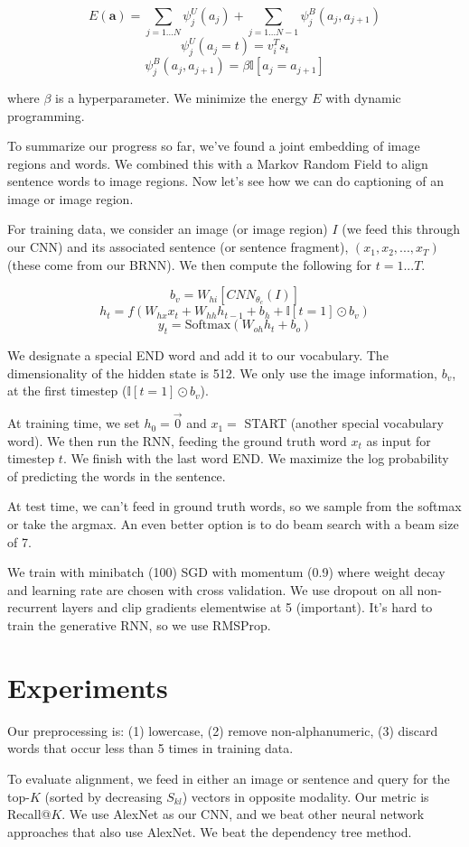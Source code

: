 \documentclass[a4paper]{article}
\begin{document}
$$
E(\mathbf{a}) = \sum_{j = 1...N}{\psi_{j}^U(a_j)}
 + \sum_{j=1...N-1}{\psi_j^B(a_j, a_{j+1})}
$$
$$
\psi_{j}^U(a_j = t) = v_i^T s_t
$$
$$
\psi_j^B(a_j, a_{j+1}) = \beta \mathbb{I}[a_j = a_{j+1}]
$$

where $\beta$ is a hyperparameter. We minimize the energy $E$ with dynamic
programming.

To summarize our progress so far, we've found a joint embedding of image regions
and words. We combined this with a Markov Random Field to align sentence words
to image regions. Now let's see how we can do captioning of an image or
image region.

For training data, we consider an image (or image region) $I$ (we feed this 
through our CNN) and its associated sentence (or sentence fragment),
$(x_1, x_2, ..., x_T)$ (these come from our BRNN). We then compute the following
for $t = 1...T$.

$$
b_v = W_{hi}[CNN_{\theta_c}(I)]
$$
$$
h_t = f(W_{hx} x_t + W_{hh} h_{t-1} + b_h + \mathbb{I}[t=1] \odot b_v)
$$
$$
y_t = \textrm{Softmax}(W_{oh} h_t + b_o)
$$

We designate a special END word and add it to our vocabulary. The 
dimensionality of the hidden state is 512. We only use the image information, 
$b_v$, at the first timestep ($\mathbb{I}[t=1] \odot b_v$).

At training time, we set $h_0 = \vec{0}$ and $x_1 = $ START (another special
vocabulary word). We then run the RNN, feeding the ground truth word $x_t$ as
input for timestep $t$. We finish with the last word END. We maximize the
log probability of predicting the words in the sentence.

At test time, we can't feed in ground truth words, so we sample from the
softmax or take the argmax. An even better option is to do beam search with
a beam size of 7.

We train with minibatch (100) SGD with momentum (0.9) where weight decay
and learning rate are chosen with cross validation. We use dropout on all
non-recurrent layers and clip gradients elementwise at 5 (important). It's hard
to train the generative RNN, so we use RMSProp.

\section{Experiments}
Our preprocessing is: (1) lowercase, (2) remove non-alphanumeric, (3) discard
words that occur less than 5 times in training data.

To evaluate alignment, we feed in either an image or sentence and query for
the top-$K$ (sorted by decreasing $S_{kl}$) vectors in opposite modality.
Our metric is Recall@$K$. We use AlexNet as our CNN, and we beat other neural
network approaches that also use AlexNet. We beat the dependency tree
method.
\end{document}
